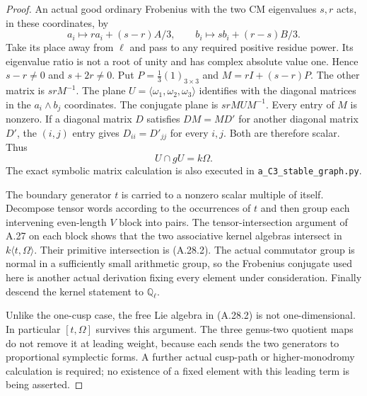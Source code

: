 \begin{proof}
An actual good ordinary Frobenius with the two CM eigenvalues
$s,r$ acts, in these coordinates, by
\[
 a_i\longmapsto r a_i+(s-r)A/3,\qquad
 b_i\longmapsto s b_i+(r-s)B/3.                         \tag{A.28.5}
\]
Take its place away from $\ell$ and pass to any required positive
residue power. Its eigenvalue ratio is not a root of unity and has
complex absolute value one. Hence $s-r\ne0$ and $s+2r\ne0$.
Put $P=\frac13(1)_{3\times3}$ and
$M=rI+(s-r)P$. The other matrix is $srM^{-1}$.
The plane $U=\langle\omega_1,\omega_2,\omega_3\rangle$
identifies with the diagonal matrices in the $a_i\wedge b_j$
coordinates. The conjugate plane is $srMUM^{-1}$.
Every entry of $M$ is nonzero. If a diagonal matrix $D$ satisfies
$DM=MD'$ for another diagonal matrix $D'$, the $(i,j)$ entry gives
$D_{ii}=D'_{jj}$ for every $i,j$. Both are therefore scalar. Thus
\[
                             U\cap gU=k\Omega.         \tag{A.28.6}
\]
The exact symbolic matrix calculation is also executed in
\texttt{a\_C3\_stable\_graph.py}.

The boundary generator $t$ is carried to a nonzero scalar multiple
of itself. Decompose tensor words according to the occurrences of
$t$ and then group each intervening even-length $V$ block into
pairs. The tensor-intersection argument of A.27 on each block
shows that the two associative kernel algebras intersect in
$k\langle t,\Omega\rangle$. Their primitive intersection is
(A.28.2). The actual commutator group is normal in a sufficiently
small arithmetic group, so the Frobenius conjugate used here is
another actual derivation fixing every element under consideration.
Finally descend the kernel statement to $\mathbb Q_\ell$.

Unlike the one-cusp case, the free Lie algebra in (A.28.2) is not
one-dimensional. In particular $[t,\Omega]$ survives this argument.
The three genus-two quotient maps do not remove it at leading
weight, because each sends the two generators to proportional
symplectic forms. A further actual cusp-path or higher-monodromy
calculation is required; no existence of a fixed element with
this leading term is being asserted.
\end{proof}
